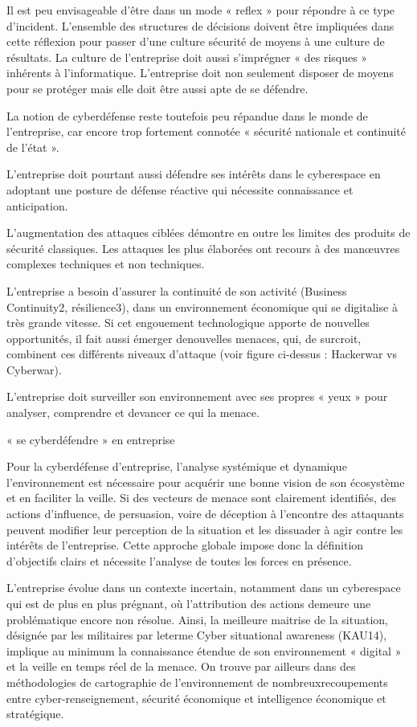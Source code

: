 Il est peu envisageable d’être dans un mode « reflex » pour répondre à ce type d’incident. L’ensemble des structures de décisions doivent être impliquées dans cette réflexion pour passer d’une culture sécurité de moyens à une culture de résultats. La culture de l’entreprise doit aussi s’imprégner « des risques » inhérents à l’informatique. L’entreprise doit non seulement disposer de moyens pour se protéger mais elle doit être aussi apte de se défendre.

La notion de cyberdéfense reste toutefois peu répandue dans le monde de l’entreprise, car encore trop fortement connotée « sécurité nationale et continuité de l’état ».

L’entreprise doit pourtant aussi défendre ses intérêts dans le cyberespace en adoptant une posture de défense réactive qui nécessite connaissance et anticipation.

L’augmentation des attaques ciblées démontre en outre les limites des produits de sécurité classiques. Les attaques les plus élaborées ont recours à des manœuvres complexes techniques et non techniques.

L’entreprise a besoin d’assurer la continuité de son activité (Business Continuity2, résilience3), dans un environnement économique qui se digitalise à très grande vitesse. Si cet engouement technologique apporte de nouvelles opportunités, il fait aussi émerger denouvelles menaces, qui, de surcroit, combinent ces différents niveaux d’attaque (voir figure ci-dessus : Hackerwar vs Cyberwar).

L’entreprise doit surveiller son environnement avec ses propres « yeux » pour analyser, comprendre et devancer ce qui la menace.
 

« se cyberdéfendre » en entreprise

Pour la cyberdéfense d’entreprise, l’analyse systémique et dynamique l’environnement est nécessaire pour acquérir une bonne vision de son écosystème et en faciliter la veille. Si des vecteurs de menace sont clairement identifiés, des actions d’influence, de persuasion, voire de déception à l’encontre des attaquants peuvent modifier leur perception de la situation et les dissuader à agir contre les intérêts de l’entreprise. Cette approche globale impose donc la définition d’objectifs clairs et nécessite l’analyse de toutes les forces en présence.

L’entreprise évolue dans un contexte incertain, notamment dans un cyberespace qui est de plus en plus prégnant, où l’attribution des actions demeure une problématique encore non résolue. Ainsi, la meilleure maitrise de la situation, désignée par les militaires par leterme Cyber situational awareness (KAU14), implique au minimum la connaissance étendue de son environnement « digital » et la veille en temps réel de la menace. On trouve par ailleurs dans des méthodologies de cartographie de l’environnement de nombreuxrecoupements entre cyber-renseignement, sécurité économique et intelligence économique et stratégique.

